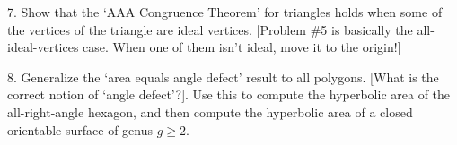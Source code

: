 \documentclass[12pt]{article}
\begin{document}
\begin{description}
\msk

\item{7.} Show that the `AAA Congruence Theorem' for triangles holds when some of the vertices of the
triangle are ideal vertices. [Problem \#5 is basically the all-ideal-vertices case. When one of them isn't
ideal, move it to the origin!]

\msk

\item{8.} Generalize the `area equals angle defect' result to all polygons. [What is the correct
notion of `angle defect'?]. Use this to compute the hyperbolic area of the all-right-angle hexagon,
and then compute the hyperbolic area of a closed orientable surface of genus $g\geq 2$. 

\msk



\end{description}
\vfill
\end{document}
